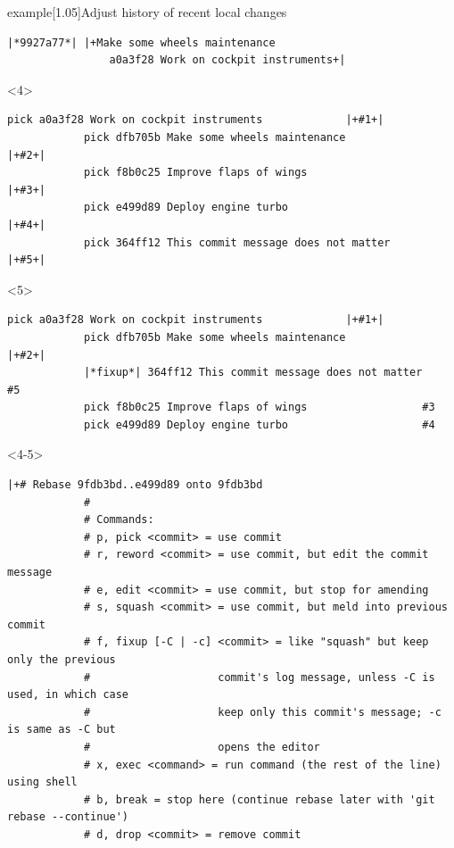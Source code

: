 \documentclass[usenames,svgnames,14pt]{beamer}
\begin{document}
\begin{frame}[c,fragile]
\begin{varblock}{example}[1.05\textwidth]{Adjust history of recent local changes}
\begin{uncoverenv}
\begin{lstlisting}[style=MyBash, aboveskip=-4pt]
                |*9927a77*| |+Make some wheels maintenance
                a0a3f28 Work on cockpit instruments+|
            \end{lstlisting}
        \end{uncoverenv}
    \end{varblock}
    \begin{onlyenv}<4>
        \begin{lstlisting}[style=MyBash]
            pick a0a3f28 Work on cockpit instruments             |+#1+|
            pick dfb705b Make some wheels maintenance            |+#2+|
            pick f8b0c25 Improve flaps of wings                  |+#3+|
            pick e499d89 Deploy engine turbo                     |+#4+|
            pick 364ff12 This commit message does not matter     |+#5+|
        \end{lstlisting}
    \end{onlyenv}
    \begin{onlyenv}<5>
        \begin{lstlisting}[style=MyBash]
            pick a0a3f28 Work on cockpit instruments             |+#1+|
            pick dfb705b Make some wheels maintenance            |+#2+|
            |*fixup*| 364ff12 This commit message does not matter    #5
            pick f8b0c25 Improve flaps of wings                  #3
            pick e499d89 Deploy engine turbo                     #4
        \end{lstlisting}
    \end{onlyenv}
    \begin{onlyenv}<4-5>
        \begin{lstlisting}[style=MyBash, basicstyle=\ttfamily\tiny\color{basic-color}, aboveskip=-4pt]
            |+# Rebase 9fdb3bd..e499d89 onto 9fdb3bd
            #
            # Commands:
            # p, pick <commit> = use commit
            # r, reword <commit> = use commit, but edit the commit message
            # e, edit <commit> = use commit, but stop for amending
            # s, squash <commit> = use commit, but meld into previous commit
            # f, fixup [-C | -c] <commit> = like "squash" but keep only the previous
            #                    commit's log message, unless -C is used, in which case
            #                    keep only this commit's message; -c is same as -C but
            #                    opens the editor
            # x, exec <command> = run command (the rest of the line) using shell
            # b, break = stop here (continue rebase later with 'git rebase --continue')
            # d, drop <commit> = remove commit

\end{lstlisting}
\end{onlyenv}
\end{frame}
\end{document}
